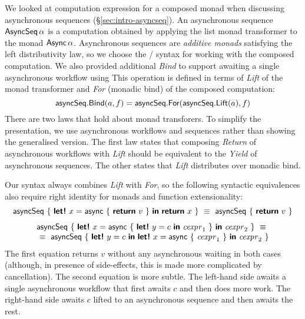\documentclass[runningheads,a4paper]{llncs}
\begin{document}
We looked at computation expression for a composed monad when discussing
asynchronous sequences (\S\ref{sec:intro-asyncseq}). An asynchronous sequence $\textnormal{\sffamily AsyncSeq}\,\alpha$ 
is a computation obtained by applying the list monad transformer \cite{list-trans} to the 
monad $\textnormal{\sffamily Async}\,\alpha$. Asynchronous sequences are \emph{additive monads} satisfying 
the left distributivity law, so we choose the / syntax for working with 
the composed computation. We also provided additional \emph{Bind} to support 
awaiting a single asynchronous workflow using  This operation is
defined in terms of \emph{Lift} of the monad transformer and \emph{For} (monadic bind) of the
composed computation:
%
\begin{equation*}
\ident{asyncSeq}.\ident{Bind}(a, f) = \ident{asyncSeq}.\ident{For}(\ident{asyncSeq}.\ident{Lift}(a), f)
\end{equation*}
%
There are two laws that hold about monad transforers. To simplify the presentation, we use asynchronous 
workflows and sequences rather than showing the generalised version. The first law states 
that composing \emph{Return} of asynchronous workflows with \emph{Lift} should be equivalent to the 
\emph{Yield} of asynchronous sequences. The other states that \emph{Lift} distributes over monadic
bind. 

Our syntax always combines \emph{Lift} with \emph{For}, so the following syntactic equivalences
also require right identity for monads and function extensionality:
%
\begin{equation*}
\begin{array}{c}
\ident{asyncSeq}~\{~ \kvd{let!}~x = \ident{async}~\{~\kvd{return}~v~\}~\kvd{in}~\kvd{return}~x ~\} ~\equiv~
  \ident{asyncSeq}~\{~ \kvd{return}~v ~\}
\\[0.7em]
\ident{asyncSeq}~\{~ \kvd{let!}~x = \ident{async}~\{~\kvd{let!}~y = c~\kvd{in}~\cexpr_1~\}~\kvd{in}~\cexpr_2 ~\} ~\equiv~\\
~\equiv~ \ident{asyncSeq}~\{~ \kvd{let!}~y = c~\kvd{in}~\kvd{let!}~x = \ident{async}~\{~\cexpr_1~\}~\kvd{in}~\cexpr_2 ~\}
\end{array}
\end{equation*}
%
The first equation returns $v$ without any asynchronous waiting in both cases
(although, in presence of side-effects, this is made more complicated by cancellation). 
The second equation is more subtle. The left-hand side awaits a single asynchronous workflow 
that first awaits $c$ and then does more work. The right-hand side awaits $c$ lifted to an 
asynchronous sequence and then awaits the rest.
\end{document}
